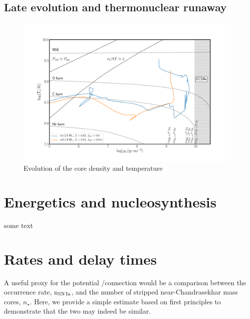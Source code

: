 \documentclass[twocolumn,tighten,times]{aastex62}
\begin{document}
\subsection{Late evolution and thermonuclear runaway}
\begin{figure}[htb!]
\begin{center}
\includegraphics[width=1.0\textwidth]{Rhoc_vs_Tc.pdf}
\caption{Evolution of the core density and temperature }
\label{fig:2}
\end{center}
\end{figure}



\section{Energetics and nucleosynthesis}\label{sec:3}
some text



\section{Rates and delay times}\label{sec:4}
A useful proxy for the potential \one/\ia connection would be a comparison between 
the \ia occurrence rate, n$_{\rm SN\,Ia}$, and the number of stripped  near-Chandrasekhar mass \one cores, $n_\star$.  Here, we provide a simple estimate based
on first principles to demonstrate that the two may indeed be similar. 
\end{document}
